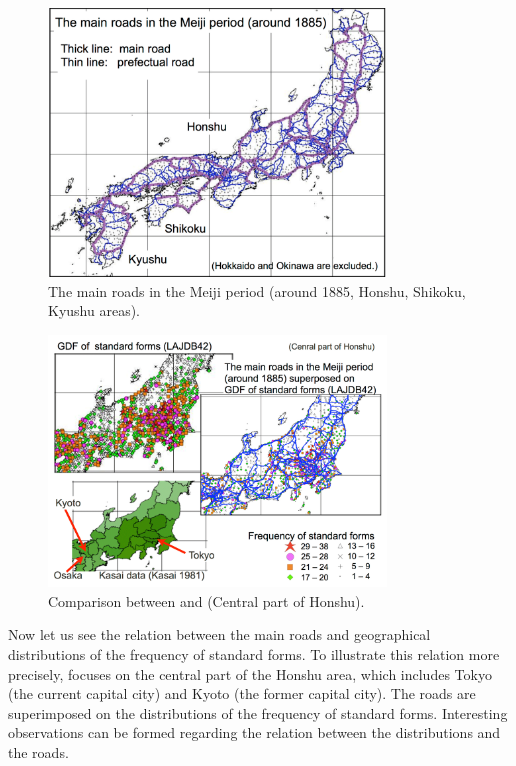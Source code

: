 \documentclass[output=paper]{LSP/langsci}
\begin{document}
\begin{figure}
\includegraphics[width=0.8\textwidth]{illustrations/kuma_fig07}
\caption{The main roads in the Meiji period (around 1885, Honshu, Shikoku, Kyushu areas).}          
\label{fig:7}
\end{figure} 
\begin{figure}
\includegraphics[width=0.8\textwidth]{illustrations/kuma_fig08}
\caption{Comparison between  and  (Central part of Honshu).}          
\label{fig:8}
\end{figure} 

Now let us see the relation between the main roads and geographical distributions of the frequency of standard forms. To illustrate this relation more precisely,  focuses on the central part of the Honshu area, which includes Tokyo (the current capital city) and Kyoto (the former capital city). The roads are superimposed on the distributions of the frequency of standard forms. Interesting observations can be formed regarding the relation between the distributions and the roads.
\end{document}
